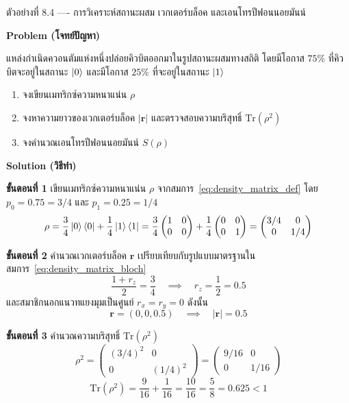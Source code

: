 \begin{psctbox}{ตัวอย่างที่ 8.4 ---- การวิเคราะห์สถานะผสม เวกเตอร์บล็อค และเอนโทรปีฟอนนอยมันน์}

\textbf{Problem (โจทย์ปัญหา)}

แหล่งกำเนิดควอนตัมแห่งหนึ่งปล่อยคิวบิตออกมาในรูปสถานะผสมทางสถิติ โดยมีโอกาส $75\%$ ที่คิวบิตจะอยู่ในสถานะ $\ket{0}$ และมีโอกาส $25\%$ ที่จะอยู่ในสถานะ $\ket{1}$
\begin{enumerate}
    \item จงเขียนเมทริกซ์ความหนาแน่น $\rho$
    \item จงหาความยาวของเวกเตอร์บล็อค $|\mathbf{r}|$ และตรวจสอบความบริสุทธิ์ $\text{Tr}(\rho^2)$
    \item จงคำนวณเอนโทรปีฟอนนอยมันน์ $S(\rho)$
\end{enumerate}

\textbf{Solution (วิธีทำ)}

\textbf{ขั้นตอนที่ 1} เขียนเมทริกซ์ความหนาแน่น $\rho$
จากสมการ~\eqref{eq:density_matrix_def} โดย $p_0 = 0.75 = 3/4$ และ $p_1 = 0.25 = 1/4$
\begin{equation*}
\rho = \frac{3}{4}\ket{0}\bra{0} + \frac{1}{4}\ket{1}\bra{1} = \frac{3}{4}\begin{pmatrix} 1 & 0 \\ 0 & 0 \end{pmatrix} + \frac{1}{4}\begin{pmatrix} 0 & 0 \\ 0 & 1 \end{pmatrix} = \begin{pmatrix} 3/4 & 0 \\ 0 & 1/4 \end{pmatrix}
\end{equation*}

\textbf{ขั้นตอนที่ 2} คำนวณเวกเตอร์บล็อค $\mathbf{r}$
เปรียบเทียบกับรูปแบบมาตรฐานในสมการ~\eqref{eq:density_matrix_bloch}
\begin{equation*}
\frac{1 + r_z}{2} = \frac{3}{4} \quad \implies \quad r_z = \frac{1}{2} = 0.5
\end{equation*}
และสมาชิกนอกแนวทแยงมุมเป็นศูนย์ $r_x = r_y = 0$ ดังนั้น
\begin{equation*}
\mathbf{r} = (0, 0, 0.5) \quad \implies \quad |\mathbf{r}| = 0.5
\end{equation*}

\textbf{ขั้นตอนที่ 3} คำนวณความบริสุทธิ์ $\text{Tr}(\rho^2)$
\begin{equation*}
\rho^2 = \begin{pmatrix} (3/4)^2 & 0 \\ 0 & (1/4)^2 \end{pmatrix} = \begin{pmatrix} 9/16 & 0 \\ 0 & 1/16 \end{pmatrix}
\end{equation*}
\begin{equation*}
\text{Tr}(\rho^2) = \frac{9}{16} + \frac{1}{16} = \frac{10}{16} = \frac{5}{8} = 0.625 < 1
\end{equation*}


\end{psctbox}
